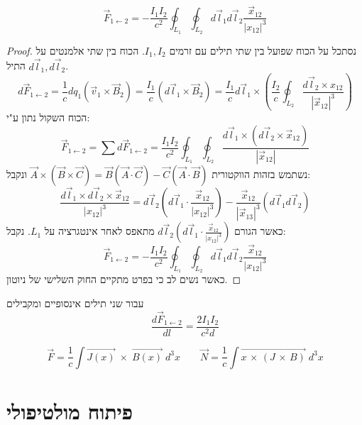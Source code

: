 \documentclass{tstextbook}
\begin{document}
\begin{proposition}
$$\vec{F}_{1\leftarrow 2}= - \frac{I_{1}I_{2}}{c^2} \oint_{L_{1}}\oint_{L_{2}} d\vec{l}_{1}d\vec{l}_{2} \frac{\vec{x}_{12}}{\lvert x_{12} \rvert ^3}$$

\end{proposition}
\begin{proof}
נסתכל על הכוח שפועל בין שתי תילים עם זרמים  \(I_{1},I_{2}\). הכוח בין שתי אלמנטים על התיל \(d\vec{l}_{1},d\vec{l}_{2}\).
$$d\vec{F}_{1\leftarrow 2 } = \frac{1}{c}dq_{1}\left( \vec{v}_{1} \times \vec{B}_{2} \right)= \frac{I_{1}}{c}\left( d\vec{l}_{1}\times \vec{B}_{2} \right) = \frac{I_{1}}{c}d\vec{l}_{1}\times\left( \frac{I_{2}}{c}\oint_{L_{2}} \frac{d\vec{l}_{2} \times x_{12}}{\left\lvert  \vec{x}_{12}  \right\rvert ^3} \right)$$
הכוח השקול נתון ע"י:
$$\vec{F}_{1\leftarrow 2} = \sum d\vec{F}_{1\leftarrow 2}=\frac{I_{1}I_{2}}{c^2}\oint_{L_{1}}\oint_{L_{2}} \frac{d\vec{l}_{1} \times \left( d\vec{l}_{2}\times \vec{x}_{12} \right)}{\left\lvert  \vec{x}_{12}  \right\rvert }$$
נשתמש בזהות הווקטורית \(\vec{A}\times\left( \vec{B}\times \vec{C} \right)=\vec{B}\left( \vec{A}\cdot \vec{C} \right)-\vec{C}\left( \vec{A}\cdot \vec{B} \right)\) ונקבל:
$$\frac{d\vec{l}_{1} \times d\vec{l}_{2} \times \vec{x}_{12}}{\lvert x_{12} \rvert ^3}=d\vec{l}_{2}\left( d\vec{l}_{1} \cdot \frac{\vec{x}_{12}}{\lvert x_{12} \rvert ^3} \right)- \frac{\vec{x}_{12}}{\left\lvert  \vec{x}_{13}  \right\rvert ^3}\left( d\vec{l}_{1}d\vec{l}_{2} \right)$$
כאשר הגורם \(d\vec{l}_{2}\left( d\vec{l}_{1} \cdot \frac{\vec{x}_{12}}{\lvert x_{12} \rvert ^3} \right)\) מתאפס לאחר אינטגרציה על \(L_{1}\). נקבל:
$$\vec{F}_{1\leftarrow 2}= - \frac{I_{1}I_{2}}{c^2} \oint_{L_{1}}\oint_{L_{2}} d\vec{l}_{1}d\vec{l}_{2} \frac{\vec{x}_{12}}{\lvert x_{12} \rvert ^3}$$
כאשר נשים לב כי בפרט מתקיים החוק השלישי של ניוטון.

\end{proof}
\begin{example}
עבור שני תילים אינסופיים ומקבילים
$$\frac{d\vec{F}_{1\leftarrow {2}}}{dl}=\frac{2I_{1}I_{2}}{c^2d}$$

\end{example}
\begin{proposition}
$$\vec{F}={\frac{1}{c}}\int\vec{J(x)}\;\times\;\vec{B(x)}\;d^{3}x\qquad {{{\vec{N}}={\frac{1}{c}}\int\vec{x\,\times\,(J\,\times\,B)}\;d^{3}x}}$$

\end{proposition}
\section{פיתוח מולטיפולי}
\end{document}
